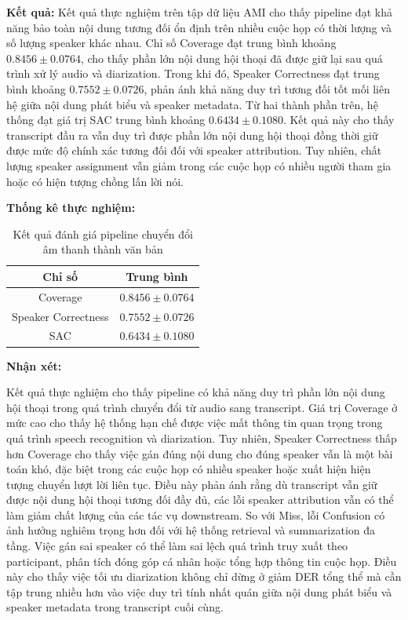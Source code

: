 \textbf{Kết quả:} Kết quả thực nghiệm trên tập dữ liệu AMI cho thấy pipeline đạt khả năng bảo toàn nội dung tương đối ổn định trên nhiều cuộc họp có thời lượng và số lượng speaker khác nhau.
Chỉ số Coverage đạt trung bình khoảng $\mathbf{0.8456 \pm 0.0764}$, cho thấy phần lớn nội dung hội thoại đã được giữ lại sau quá trình xử lý audio và diarization. Trong khi đó, Speaker Correctness đạt trung bình khoảng $\mathbf{0.7552 \pm 0.0726}$, phản ánh khả năng duy trì tương đối tốt mối liên hệ giữa nội dung phát biểu và speaker metadata.
Từ hai thành phần trên, hệ thống đạt giá trị SAC trung bình khoảng $\mathbf{0.6434 \pm 0.1080}$. Kết quả này cho thấy transcript đầu ra vẫn duy trì được phần lớn nội dung hội thoại đồng thời giữ được mức độ chính xác tương đối đối với speaker attribution. Tuy nhiên, chất lượng speaker assignment vẫn giảm trong các cuộc họp có nhiều người tham gia hoặc có hiện tượng chồng lấn lời nói.

\textbf{Thống kê thực nghiệm:}
\begin{table}[H]
\centering
\begin{tabular}{|c|c|}
\hline
\textbf{Chỉ số} & \textbf{Trung bình} \\
\hline
Coverage & $0.8456 \pm 0.0764$ \\
\hline
Speaker Correctness & $0.7552 \pm 0.0726$ \\
\hline
SAC & $0.6434 \pm 0.1080$ \\
\hline
\end{tabular}
\caption{Kết quả đánh giá pipeline chuyển đổi âm thanh thành văn bản}
\end{table}

\textbf{Nhận xét:}

Kết quả thực nghiệm cho thấy pipeline có khả năng duy trì phần lớn nội dung hội thoại trong quá trình chuyển đổi từ audio sang transcript. Giá trị Coverage ở mức cao cho thấy hệ thống hạn chế được việc mất thông tin quan trọng trong quá trình speech recognition và diarization.
Tuy nhiên, Speaker Correctness thấp hơn Coverage cho thấy việc gán đúng nội dung cho đúng speaker vẫn là một bài toán khó, đặc biệt trong các cuộc họp có nhiều speaker hoặc xuất hiện hiện tượng chuyển lượt lời liên tục. Điều này phản ánh rằng dù transcript vẫn giữ được nội dung hội thoại tương đối đầy đủ, các lỗi speaker attribution vẫn có thể làm giảm chất lượng của các tác vụ downstream.
So với Miss, lỗi Confusion có ảnh hưởng nghiêm trọng hơn đối với hệ thống retrieval và summarization đa tầng. Việc gán sai speaker có thể làm sai lệch quá trình truy xuất theo participant, phân tích đóng góp cá nhân hoặc tổng hợp thông tin cuộc họp. Điều này cho thấy việc tối ưu diarization không chỉ dừng ở giảm DER tổng thể mà cần tập trung nhiều hơn vào việc duy trì tính nhất quán giữa nội dung phát biểu và speaker metadata trong transcript cuối cùng.